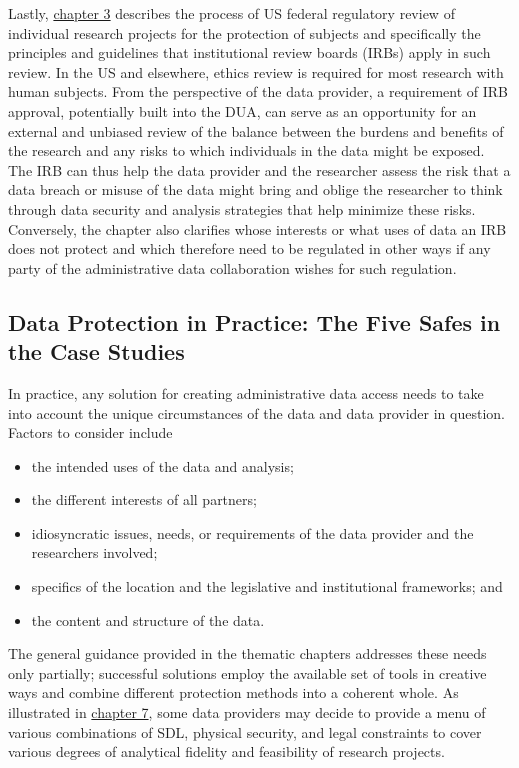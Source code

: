 Lastly, \protect\hyperlink{irb}{chapter 3} describes the process of US federal regulatory review of individual research projects for the protection of subjects and specifically the principles and guidelines that institutional review boards (IRBs) apply in such review. In the US and elsewhere, ethics review is required for most research with human subjects. From the perspective of the data provider, a requirement of IRB approval, potentially built into the DUA, can serve as an opportunity for an external and unbiased review of the balance between the burdens and benefits of the research and any risks to which individuals in the data might be exposed. The IRB can thus help the data provider and the researcher assess the risk that a data breach or misuse of the data might bring and oblige the researcher to think through data security and analysis strategies that help minimize these risks. Conversely, the chapter also clarifies whose interests or what uses of data an IRB does not protect and which therefore need to be regulated in other ways if any party of the administrative data collaboration wishes for such regulation.

\hypertarget{data-protection-in-practice-the-five-safes-in-the-case-studies}{%
\subsection{Data Protection in Practice: The Five Safes in the Case Studies}\label{data-protection-in-practice-the-five-safes-in-the-case-studies}}

In practice, any solution for creating administrative data access needs to take into account the unique circumstances of the data and data provider in question. Factors to consider include
\begin{itemize}
\item
  the intended uses of the data and analysis;
\item
  the different interests of all partners;
\item
  idiosyncratic issues, needs, or requirements of the data provider and the researchers involved;
\item
  specifics of the location and the legislative and institutional frameworks; and
\item
  the content and structure of the data.
\end{itemize}

The general guidance provided in the thematic chapters addresses these needs only partially; successful solutions employ the available set of tools in creative ways and combine different protection methods into a coherent whole. As illustrated in \protect\hyperlink{iab}{chapter 7}, some data providers may decide to provide a menu of various combinations of SDL, physical security, and legal constraints to cover various degrees of analytical fidelity and feasibility of research projects.

